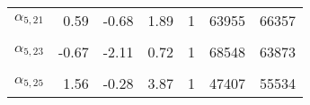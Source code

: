 \begin{longtable}[t]{lrrrrrr}
$\alpha_{5, 21}$ & 0.59 & -0.68 & 1.89 & 1 & 63955 & 66357\\
\cellcolor{gray!6}{$\alpha_{5, 22}$} & \cellcolor{gray!6}{1.68} & \cellcolor{gray!6}{0.26} & \cellcolor{gray!6}{3.29} & \cellcolor{gray!6}{1} & \cellcolor{gray!6}{65585} & \cellcolor{gray!6}{60737}\\
$\alpha_{5, 23}$ & -0.67 & -2.11 & 0.72 & 1 & 68548 & 63873\\
\cellcolor{gray!6}{$\alpha_{5, 24}$} & \cellcolor{gray!6}{0.05} & \cellcolor{gray!6}{-1.35} & \cellcolor{gray!6}{1.53} & \cellcolor{gray!6}{1} & \cellcolor{gray!6}{59274} & \cellcolor{gray!6}{61913}\\
$\alpha_{5, 25}$ & 1.56 & -0.28 & 3.87 & 1 & 47407 & 55534\\*
\end{longtable}